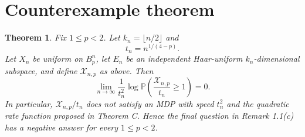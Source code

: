 \documentclass[11pt]{article}
\newtheorem{theorem}{Theorem}
\newcommand{\Pp}{\mathbb P}
\newcommand{\Xscr}{\mathscr X}
\begin{document}
\section{Counterexample theorem}

\begin{theorem}\label{thm:main}
Fix $1\le p<2$.  Let $k_n=\lfloor n/2\rfloor$ and
\[
 t_n=n^{1/(4-p)}.
\]
Let $X_n$ be uniform on $B_p^n$, let $E_n$ be an independent Haar-uniform
$k_n$-dimensional subspace, and define $\Xscr_{n,p}$ as above.  Then
\[
 \lim_{n\to\infty}\frac1{t_n^2}
 \log\Pp\!\left(\frac{\Xscr_{n,p}}{t_n}\ge1\right)=0.
\]
In particular, $\Xscr_{n,p}/t_n$ does not satisfy an MDP with speed $t_n^2$
and the quadratic rate function proposed in Theorem C.  Hence the final
question in Remark 1.1(c) has a negative answer for every $1\le p<2$.
\end{theorem}
\end{document}
